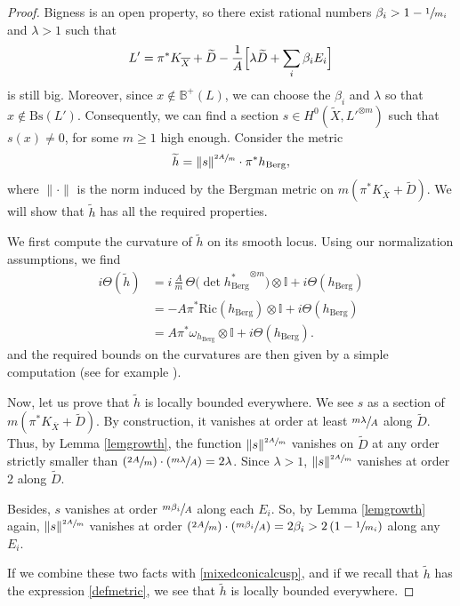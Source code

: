 \documentclass[10pt]{amsart}
\newcommand{\Psfrac}[2]{(\sfrac{#1}{#2})}
\theoremstyle{plain}
\theoremstyle{definition}
\numberwithin{equation}{theorem}
\newcommand{\norm}[1] { \| #1 \| }
\begin{document}
\begin{proof}
Bigness is an open property, so there exist rational numbers $\beta_i > 1 - \sfrac{1}{m_i}$ and $\lambda > 1$ such that
$$
L' = \pi^\ast K_{\overline{X}} + \widetilde{D} - \frac{1}{A} \Bigl[ \lambda \widetilde{D} + \sum_i \beta_i E_i \Bigr]
$$
is still big. Moreover, since $x \not\in \mathbb B^+ (L)$, we can choose the $\beta_i$ and $\lambda$ so that $x \not\in \mathrm{Bs}(L')$. Consequently, we can find a section $s \in H^0(\widetilde{X}, L'^{\otimes m})$ such that $s(x) \neq 0$, for some $m \geq 1$ high enough. Consider the metric
\begin{equation} \label{defmetric}
\widetilde{h} = \norm{s}^{\sfrac{2 A}{m}}\cdot \pi^\ast h_{\mathrm{Berg}},
\end{equation}
where $\norm{\cdot}$ is the norm induced by the Bergman metric on $m ( \pi^\ast K_{\overline{X}} + \widetilde{D} )$. We will show that $\widetilde{h}$ has all the required properties.

We first compute the curvature of $\widetilde{h}$ on its smooth locus. Using our normalization assumptions, we find
\begin{align*}
i \Theta(\widetilde{h}) & = i \,\frac{A}{m}\, \Theta \bigl( \det {h^\ast_{\mathrm{Berg}}}^{\otimes m} \bigr) \otimes \mathbb{I} + i \Theta(h_{\mathrm{Berg}}) \\
	& = - A \pi^\ast \mathrm{Ric} (h_{\mathrm{Berg}}) \otimes \mathbb I+ i \Theta(h_{\mathrm{Berg}}) \\
	& = A \pi^\ast \omega_{h_{\mathrm{Berg}}} \otimes \mathbb I+ i \Theta(h_{\mathrm{Berg}}).
\end{align*}
and the required bounds on the curvatures are then given by a simple computation (see for example \cite{cad16}).

Now, let us prove that $\widetilde{h}$ is locally bounded everywhere. We see $s$ as a section of $m( \pi^\ast K_{\overline{X}} + \widetilde{D})$. By construction, it vanishes at order at least $\sfrac{m \lambda}{A}$ along $\widetilde{D}$. Thus, by Lemma \ref{lemgrowth}, the function $\norm{s}^{\sfrac{2A}{m}}$ vanishes on $\widetilde{D}$ at any order strictly smaller than $\Psfrac{2 A}{m} \cdot \Psfrac{m\lambda}{A} = 2 \lambda$. Since $\lambda > 1$, $\norm{s}^{\sfrac{2 A}{m}}$ vanishes at order $2$ along $\widetilde{D}$.

Besides, $s$ vanishes at order $\sfrac{m \beta_i}{A}$ along each $E_i$. So, by Lemma \ref{lemgrowth} again, $\norm{s}^{\sfrac{2A}{m}}$ vanishes at order $\Psfrac{2A}{m} \cdot \Psfrac{m \beta_i}{A} = 2 \beta_i > 2 \left( 1 - \sfrac{1}{m_i} \right)$ along any $E_i$.

If we combine these two facts with \eqref{mixedconicalcusp}, and if we recall that $\widetilde{h}$ has the expression \eqref{defmetric}, we see that $\widetilde{h}$ is locally bounded everywhere.
\end{proof}
\end{document}
